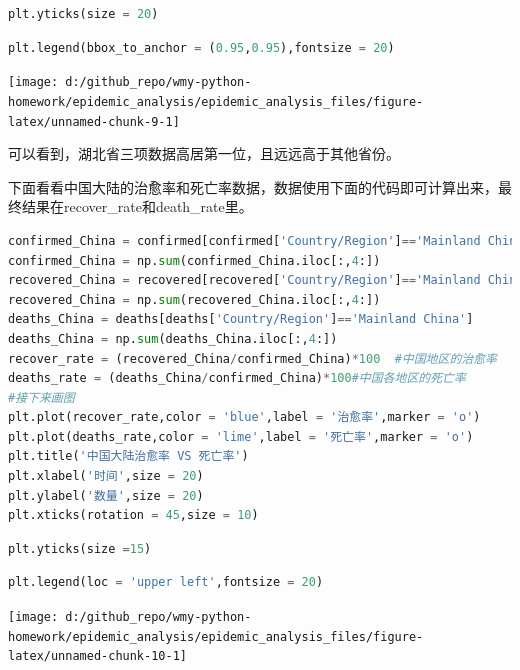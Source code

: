 \documentclass[UTF8,a4paper,12pt]{ctexart}  %
\begin{document}
\begin{lstlisting}[language=Python]
plt.yticks(size = 20)
\end{lstlisting}

\begin{lstlisting}[language=Python]
plt.legend(bbox_to_anchor = (0.95,0.95),fontsize = 20)
\end{lstlisting}

\begin{center}\texttt{[image: d:/github\_repo/wmy-python-homework/epidemic\_analysis/epidemic\_analysis\_files/figure-latex/unnamed-chunk-9-1]} \end{center}

可以看到，湖北省三项数据高居第一位，且远远高于其他省份。

下面看看中国大陆的治愈率和死亡率数据，数据使用下面的代码即可计算出来，最终结果在recover\_rate和death\_rate里。

\begin{lstlisting}[language=Python]
confirmed_China = confirmed[confirmed['Country/Region']=='Mainland China']
confirmed_China = np.sum(confirmed_China.iloc[:,4:])
recovered_China = recovered[recovered['Country/Region']=='Mainland China']
recovered_China = np.sum(recovered_China.iloc[:,4:])
deaths_China = deaths[deaths['Country/Region']=='Mainland China']
deaths_China = np.sum(deaths_China.iloc[:,4:])
recover_rate = (recovered_China/confirmed_China)*100  #中国地区的治愈率
deaths_rate = (deaths_China/confirmed_China)*100#中国各地区的死亡率
#接下来画图
plt.plot(recover_rate,color = 'blue',label = '治愈率',marker = 'o')
plt.plot(deaths_rate,color = 'lime',label = '死亡率',marker = 'o')
plt.title('中国大陆治愈率 VS 死亡率')
plt.xlabel('时间',size = 20)
plt.ylabel('数量',size = 20)
plt.xticks(rotation = 45,size = 10)
\end{lstlisting}

\begin{lstlisting}[language=Python]
plt.yticks(size =15)
\end{lstlisting}

\begin{lstlisting}[language=Python]
plt.legend(loc = 'upper left',fontsize = 20)
\end{lstlisting}

\begin{center}\texttt{[image: d:/github\_repo/wmy-python-homework/epidemic\_analysis/epidemic\_analysis\_files/figure-latex/unnamed-chunk-10-1]} \end{center}
\end{document}
